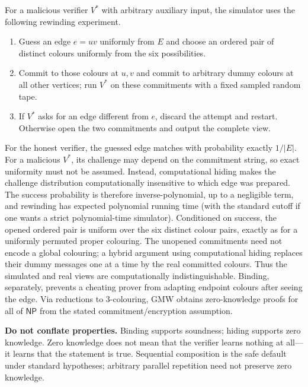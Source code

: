 \documentclass[10pt]{article}
\newcommand{\NP}{\mathsf{NP}}
\begin{document}
For a malicious verifier $V^*$ with arbitrary auxiliary input, the simulator
uses the following rewinding experiment.
\begin{enumerate}
\item Guess an edge $e=uv$ uniformly from $E$ and choose an ordered pair of
distinct colours uniformly from the six possibilities.
\item Commit to those colours at $u,v$ and commit to arbitrary dummy colours at
all other vertices; run $V^*$ on these commitments with a fixed sampled random
tape.
\item If $V^*$ asks for an edge different from $e$, discard the attempt and
restart.  Otherwise open the two commitments and output the complete view.
\end{enumerate}
For the honest verifier, the guessed edge matches with probability exactly
$1/|E|$.  For a malicious $V^*$, its challenge may depend on the commitment
string, so exact uniformity must not be assumed.  Instead, computational hiding
makes the challenge distribution computationally insensitive to which edge was
prepared.  The success probability is therefore inverse-polynomial, up to a
negligible term, and rewinding has expected polynomial running time (with the
standard cutoff if one wants a strict polynomial-time simulator).  Conditioned
on success, the opened ordered pair is uniform over the six distinct colour
pairs, exactly as for a uniformly permuted proper colouring.  The unopened
commitments need not encode a global colouring; a hybrid argument using
computational hiding replaces their dummy messages one at a time by the real
committed colours.  Thus the simulated and real views are computationally
indistinguishable.  Binding, separately, prevents a cheating prover from
adapting endpoint colours after seeing the edge.
Via reductions to 3-colouring, GMW obtains zero-knowledge proofs for all of
$\NP$ from the stated commitment/encryption assumption.

\textbf{Do not conflate properties.}  Binding supports soundness; hiding supports
zero knowledge.  Zero knowledge does not mean that the verifier learns nothing
at all---it learns that the statement is true.  Sequential composition is the
safe default under standard hypotheses; arbitrary parallel repetition need not
preserve zero knowledge.
\end{document}
